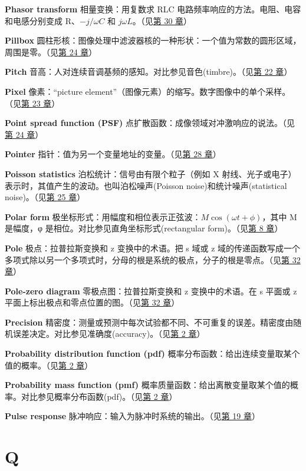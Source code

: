 \textbf{Phasor transform} 相量变换：用复数求 RLC
电路频率响应的方法。电阻、电容和电感分别变成 R、\(-j/\omega C\) 和
\(j\omega L\)。（见\hyperref[ch-30]{第 30 章}）

\textbf{Pillbox}
圆柱形核：图像处理中滤波器核的一种形状：一个值为常数的圆形区域，周围是零。（见\hyperref[ch-24]{第
24 章}）

\textbf{Pitch}
音高：人对连续音调基频的感知。对比参见音色(timbre)。（见\hyperref[ch-22]{第
22 章}）

\textbf{Pixel} 像素：``picture
element''（图像元素）的缩写。数字图像中的单个采样。（见\hyperref[ch-23]{第
23 章}）

\textbf{Point spread function (PSF)}
点扩散函数：成像领域对冲激响应的说法。（见\hyperref[ch-24]{第 24 章}）

\textbf{Pointer} 指针：值为另一个变量地址的变量。（见\hyperref[ch-28]{第
28 章}）

\textbf{Poisson statistics} 泊松统计：信号由有限个粒子（例如 X
射线、光子或电子）表示时，其值产生的波动。也叫泊松噪声(Poisson
noise)和统计噪声(statistical noise)。（见\hyperref[ch-25]{第 25 章}）

\textbf{Polar form}
极坐标形式：用幅度和相位表示正弦波：\(M\cos(\omega t + \phi)\)，其中 M
是幅度，φ 是相位。对比参见直角坐标形式(rectangular
form)。（见\hyperref[ch-08]{第 8 章}）

\textbf{Pole} 极点：拉普拉斯变换和 z 变换中的术语。把 s 域或 z
域的传递函数写成一个多项式除以另一个多项式时，分母的根是系统的极点，分子的根是零点。（见\hyperref[ch-32]{第
32 章}）

\textbf{Pole-zero diagram} 零极点图：拉普拉斯变换和 z 变换中的术语。在 s
平面或 z 平面上标出极点和零点位置的图。（见\hyperref[ch-32]{第 32 章}）

\textbf{Precision}
精密度：测量或预测中每次试验都不同、不可重复的误差。精密度由随机误差决定。对比参见准确度(accuracy)。（见\hyperref[ch-02]{第
2 章}）

\textbf{Probability distribution function (pdf)}
概率分布函数：给出连续变量取某个值的概率。（见\hyperref[ch-02]{第 2
章}）

\textbf{Probability mass function (pmf)}
概率质量函数：给出离散变量取某个值的概率。对比参见概率分布函数(pdf)。（见\hyperref[ch-02]{第
2 章}）

\textbf{Pulse response}
脉冲响应：输入为脉冲时系统的输出。（见\hyperref[ch-19]{第 19 章}）

\section{Q}

